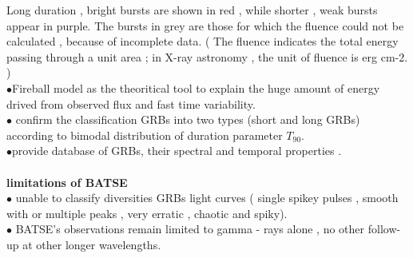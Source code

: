 Long  duration ,  bright  bursts  are  shown  in  red , while  shorter , weak bursts appear in  purple.  The bursts  in  grey  are  those  for  which  the  fluence  could  not  be  calculated ,  because  of  incomplete  data. ( The  fluence  indicates  the  total  energy  passing  through   a unit  area ; in  X-ray  astronomy , the  unit  of  fluence is erg cm-2. )\\
$\bullet$Fireball model as  the  theoritical tool  to  explain  the  huge  amount of energy   drived  from  observed  flux  and  fast   time  variability.\\
$\bullet$ confirm  the classification GRBs into two types (short and long GRBs) according to  bimodal  distribution  of  duration parameter $ T_{90} $.\\
$\bullet$provide  database  of  GRBs, their  spectral  and  temporal  properties \citep{7}.\\\\
\textbf{limitations of BATSE}\\
$\bullet$ unable   to   classify   diversities   GRBs  light  curves  ( single  spikey  pulses ,  smooth   with  or  multiple  peaks , very   erratic , chaotic  and  spiky).\\ 
$\bullet$   BATSE’s     observations    remain   limited   to    gamma - rays    alone ,   no  other   follow-up   at   other  longer   wavelengths. 
\citep{ 6  ,  7}\\\\
